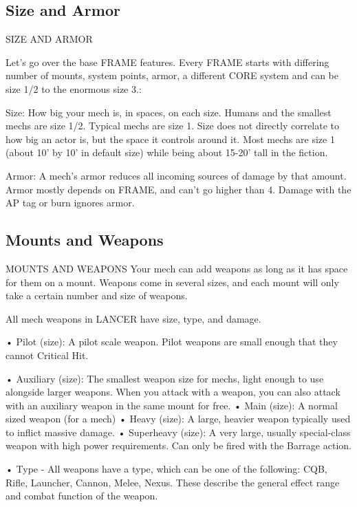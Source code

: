 \subsection{Size and Armor}
                                        SIZE AND ARMOR  

Let’s go over the base FRAME features. Every FRAME starts with differing number of mounts,  
system points, armor, a different CORE system and can be size 1/2 to the enormous size 3.:
 

Size: How big your mech is, in spaces, on each size. Humans and the smallest mechs are size  
1/2. Typical mechs are size 1. Size does not directly correlate to how big an actor is, but the  
space it controls around it. Most mechs are size 1 (about 10’ by 10’ in default size) while being  
about 15-20’ tall in the fiction.
 
Armor: A mech’s armor reduces all incoming sources of damage by that amount. Armor mostly  
depends on FRAME, and can’t go higher than 4. Damage with the AP tag or burn ignores armor.
 
\subsection{Mounts and Weapons}
                                   MOUNTS AND WEAPONS  
Your mech can add weapons as long as it has space for them on a mount. Weapons come in  
several sizes, and each mount will only take a certain number and size of weapons.
 

All mech weapons in LANCER have size, type, and damage.  

                                                                                                           


•  Pilot (size): A pilot scale weapon. Pilot weapons are small enough that they cannot Critical Hit.
 
•  Auxiliary (size): The smallest weapon size for mechs, light enough to use alongside larger  
  weapons. When you attack with a weapon, you can also attack with an auxiliary weapon in the  
  same mount for free.  
•  Main (size): A normal sized weapon (for a mech)  
•  Heavy (size): A large, heavier weapon typically used to inflict massive damage.  
•  Superheavy (size): A very large, usually special-class weapon with high power requirements.  
  Can only be fired with the Barrage action.  

•  Type - All weapons have a type, which can be one of the following: CQB, Rifle, Launcher,  
  Cannon, Melee, Nexus. These describe the general effect range and combat function of the  
  weapon.
 

